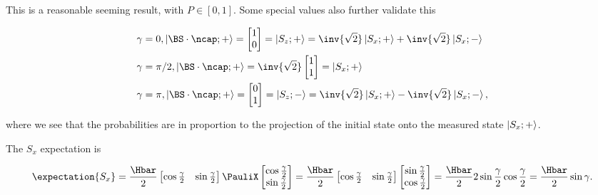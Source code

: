 {This is a reasonable seeming result, with \( P \in [0, 1] \).  Some special values also further validate this

\begin{equation}\label{eqn:moreBraKetProblems:760}
\begin{aligned}
\gamma &= 0, \ket{\BS \cdot \ncap ; + } =
\begin{bmatrix}
1 \\
0
\end{bmatrix}
=
\ket{S_z ; +} 
= 
\inv{\sqrt{2}} \ket{S_x;+}
+\inv{\sqrt{2}} \ket{S_x;-}
\\
\gamma &= \pi/2, \ket{\BS \cdot \ncap ; + } =
\inv{\sqrt{2}}
\begin{bmatrix}
1 \\
1
\end{bmatrix}
=
\ket{S_x ; +} 
\\
\gamma &= \pi, \ket{\BS \cdot \ncap ; + } =
\begin{bmatrix}
0 \\
1
\end{bmatrix}
=
\ket{S_z ; -} 
= 
\inv{\sqrt{2}} \ket{S_x;+}
-\inv{\sqrt{2}} \ket{S_x;-},
\end{aligned}
\end{equation}

where we see that the probabilities are in proportion to the projection of the initial state onto the measured state \( \left\lvert {S_x ; +} \right\rangle \).


The \( S_x \) expectation is

\begin{dmath}\label{eqn:moreBraKetProblems:780}
\expectation{S_x} 
=
\frac{\Hbar}{2}
\begin{bmatrix}
\cos\frac{\gamma}{2} & \sin\frac{\gamma}{2}
\end{bmatrix}
\PauliX
\begin{bmatrix}
\cos\frac{\gamma}{2} \\
\sin\frac{\gamma}{2}
\end{bmatrix}
=
\frac{\Hbar}{2}
\begin{bmatrix}
\cos\frac{\gamma}{2} & \sin\frac{\gamma}{2}
\end{bmatrix}
\begin{bmatrix}
\sin\frac{\gamma}{2} \\
\cos\frac{\gamma}{2} 
\end{bmatrix}
=
\frac{\Hbar}{2} 2 \sin\frac{\gamma}{2} \cos\frac{\gamma}{2} 
=
\frac{\Hbar}{2} \sin\gamma.
\end{dmath}

}
